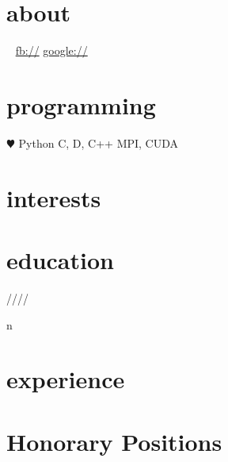 \documentclass[]{fancy-cv}
\begin{document}
\header{\MakeLowercase\myfirstname}{\MakeLowercase\mylastname}
       {\MakeLowercase\mytitle}

\begin{aside}
  \section{about}
    \myaddress%
    \mycity
    ~
    \href{mailto:\myemail}{\myemail}
    \href{\mywebsite}{\mywebsite}
    \href{http://facebook.com/\myfb}{fb://\myfb}
    \href{http://plug.google.com/\mygp}{google://\mygp}
  \section{programming}
    {\color{red} $\varheartsuit$} Python
    C, D, C++
    MPI, CUDA
\end{aside}

\section{interests}
\MakeLowercase\interests

\section{education}
\label{sec:education}

\begin{entrylist}
   \year/\degree/\school/\city/\subtitle in \education {
    \entry{\year}{\degree}{\school}{\subtitle}
  }
\end{entrylist}

\section{experience}
\label{sec:experience}

\section{Honorary Positions}
\label{sec:honorary-positions}

\end{document}
